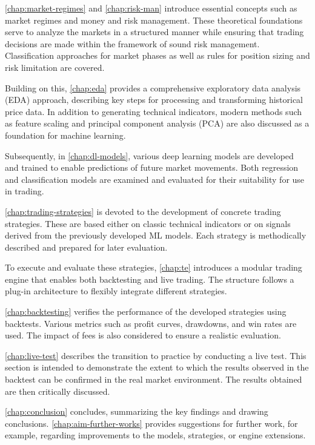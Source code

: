 \autoref{chap:market-regimes} and \autoref{chap:risk-man} introduce essential concepts such as market regimes and money and risk management.
These theoretical foundations serve to analyze the markets in a structured manner while ensuring that trading decisions are made within the framework of sound risk management.
Classification approaches for market phases as well as rules for position sizing and risk limitation are covered.


Building on this, \autoref{chap:eda} provides a comprehensive exploratory data analysis (EDA) approach, describing key steps for processing and transforming historical price data.
In addition to generating technical indicators, modern methods such as feature scaling and principal component analysis (PCA) are also discussed as a foundation for machine learning.

Subsequently, in \autoref{chap:dl-models}, various deep learning models are developed and trained to enable predictions of future market movements.
Both regression and classification models are examined and evaluated for their suitability for use in trading.

\autoref{chap:trading-strategies} is devoted to the development of concrete trading strategies.
These are based either on classic technical indicators or on signals derived from the previously developed ML models.
Each strategy is methodically described and prepared for later evaluation.

To execute and evaluate these strategies, \autoref{chap:te} introduces a modular trading engine that enables both backtesting and live trading.
The structure follows a plug-in architecture to flexibly integrate different strategies.

\autoref{chap:backtesting} verifies the performance of the developed strategies using backtests.
Various metrics such as profit curves, drawdowns, and win rates are used.
The impact of fees is also considered to ensure a realistic evaluation.

\autoref{chap:live-test} describes the transition to practice by conducting a live test.
This section is intended to demonstrate the extent to which the results observed in the backtest can be confirmed in the real market environment.
The results obtained are then critically discussed.

\autoref{chap:conclusion} concludes, summarizing the key findings and drawing conclusions.
\autoref{chap:aim-further-works} provides suggestions for further work, for example, regarding improvements to the models, strategies, or engine extensions.